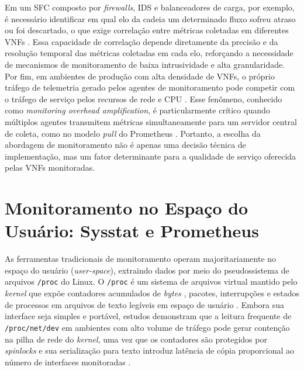 Em um SFC composto por \textit{firewalls}, IDS e balanceadores de carga, por exemplo, é necessário identificar em qual elo da cadeia um determinado fluxo sofreu atraso ou foi descartado, o que exige correlação entre métricas coletadas em diferentes VNFs \cite{10.23919, oliveira_observability_2026}. Essa capacidade de correlação depende diretamente da precisão e da resolução temporal das métricas coletadas em cada elo, reforçando a necessidade de mecanismos de monitoramento de baixa intrusividade e alta granularidade.
Por fim, em ambientes de produção com alta densidade de VNFs, o próprio tráfego de telemetria gerado pelos agentes de monitoramento pode competir com o tráfego de serviço pelos recursos de rede e CPU \cite{kannan2024designing}. Esse fenômeno, conhecido como \textit{monitoring overhead amplification}, é particularmente crítico quando múltiplos agentes transmitem métricas simultaneamente para um servidor central de coleta, como no modelo \textit{pull} do Prometheus \cite{usman_observability_2022}. Portanto, a escolha da abordagem de monitoramento não é apenas uma decisão técnica de implementação, mas um fator determinante para a qualidade de serviço oferecida pelas VNFs monitoradas.

\section{Monitoramento no Espaço do Usuário: Sysstat e Prometheus}
\label{sec:sysstat_prometheus}

As ferramentas tradicionais de monitoramento operam majoritariamente no espaço do usuário (\textit{user-space}), extraindo dados por meio do pseudossistema de arquivos \texttt{/proc} do Linux. O \texttt{/proc} é um sistema de arquivos virtual mantido pelo \textit{kernel} que expõe contadores acumulados de \textit{bytes} , pacotes, interrupções e estados de processos em arquivos de texto legíveis em espaço de usuário \cite{linux_proc_man}. Embora sua interface seja simples e portável, estudos demonstram que a leitura frequente de \texttt{/proc/net/dev} em ambientes com alto volume de tráfego pode gerar contenção na pilha de rede do \textit{kernel}, uma vez que os contadores são protegidos por \textit{spinlocks} e sua serialização para texto introduz latência de cópia proporcional ao número de interfaces monitoradas \cite{10.1145/3452296.3472888}.

